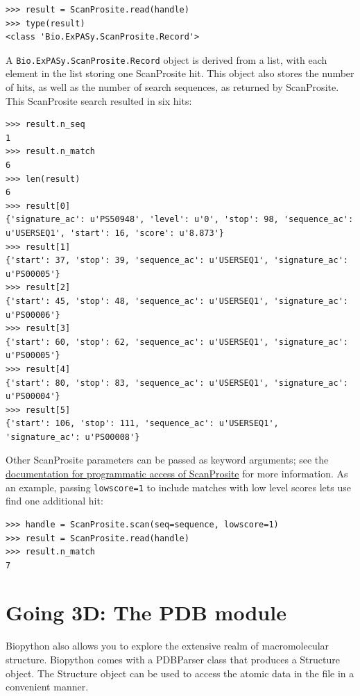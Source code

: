 \documentclass{report}
\begin{document}
\begin{verbatim}
>>> result = ScanProsite.read(handle)
>>> type(result)
<class 'Bio.ExPASy.ScanProsite.Record'>
\end{verbatim}

A \verb+Bio.ExPASy.ScanProsite.Record+ object is derived from a list, with each element in the list storing one ScanProsite hit. This object also stores the number of hits, as well as the number of search sequences, as returned by ScanProsite. This ScanProsite search resulted in six hits:

\begin{verbatim}
>>> result.n_seq
1
>>> result.n_match
6
>>> len(result)
6
>>> result[0]
{'signature_ac': u'PS50948', 'level': u'0', 'stop': 98, 'sequence_ac': u'USERSEQ1', 'start': 16, 'score': u'8.873'}
>>> result[1]
{'start': 37, 'stop': 39, 'sequence_ac': u'USERSEQ1', 'signature_ac': u'PS00005'}
>>> result[2]
{'start': 45, 'stop': 48, 'sequence_ac': u'USERSEQ1', 'signature_ac': u'PS00006'}
>>> result[3]
{'start': 60, 'stop': 62, 'sequence_ac': u'USERSEQ1', 'signature_ac': u'PS00005'}
>>> result[4]
{'start': 80, 'stop': 83, 'sequence_ac': u'USERSEQ1', 'signature_ac': u'PS00004'}
>>> result[5]
{'start': 106, 'stop': 111, 'sequence_ac': u'USERSEQ1', 'signature_ac': u'PS00008'}
\end{verbatim}

Other ScanProsite parameters can be passed as keyword arguments; see the \href{http://www.expasy.org/tools/scanprosite/ScanPrositeREST.html}{documentation for programmatic access of ScanProsite} for more information. As an example, passing \verb+lowscore=1+ to include matches with low level scores lets use find one additional hit:

\begin{verbatim}
>>> handle = ScanProsite.scan(seq=sequence, lowscore=1)
>>> result = ScanProsite.read(handle)
>>> result.n_match
7
\end{verbatim}

\chapter{Going 3D: The PDB module}

Biopython also allows you to explore the extensive realm of macromolecular structure.
Biopython comes with a PDBParser class that produces a Structure object. The Structure object
can be used to access the atomic data in the file in a convenient manner.

\end{document}

